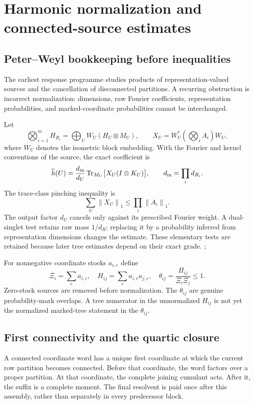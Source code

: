\documentclass[11pt,oneside,openany]{book}
\theoremstyle{definition}
\theoremstyle{remark}
\newcommand{\Tr}{\operatorname{Tr}}
\newcommand{\norm}[1]{\left\lVert#1\right\rVert}
\newcommand{\src}[2]{\cite[#2]{#1}}
\begin{document}
\chapter{Harmonic normalization and connected-source estimates}
\label{ch:trees}
\section{Peter--Weyl bookkeeping before inequalities}
The earliest response programme studies products of representation-valued sources and the cancellation of disconnected partitions. A recurring obstruction is incorrect normalization: dimensions, raw Fourier coefficients, representation probabilities, and marked-coordinate probabilities cannot be interchanged.

Let
\[
\bigotimes_{i=1}^m H_{R_i}
=\bigoplus_U W_U(H_U\otimes M_U),\qquad
X_U=W_U^*\left(\bigotimes_i A_i\right)W_U,
\]
where $W_U$ denotes the isometric block embedding. With the Fourier and kernel conventions of the source, the exact coefficient is
\begin{equation}\label{eq:PW}
\widehat h(U)=\frac{d_{\rm in}}{d_U}
\Tr_{M_U}\bigl[X_U(I\otimes K_U)\bigr],\qquad
 d_{\rm in}=\prod_i d_{R_i}.
\end{equation}
The trace-class pinching inequality is
\begin{equation}\label{eq:pinching}
\sum_U\norm{X_U}_1\le\prod_i\norm{A_i}_1.
\end{equation}
The output factor $d_U$ cancels only against its prescribed Fourier weight. A dual-singlet test retains raw mass $1/d_R$; replacing it by a probability inferred from representation dimensions changes the estimate. These elementary tests are retained because later tree estimates depend on their exact grade. \src{F1}{harmonic source programme}; \src{F2}{opening normalization audit}

For nonnegative coordinate stocks $a_{i,e}$ define
\begin{equation}\label{eq:marks}
\Xi_i=\sum_e a_{i,e},\quad
H_{ij}=\sum_e a_{i,e}a_{j,e},\quad
\theta_{ij}=\frac{H_{ij}}{\Xi_i\Xi_j}\le1.
\end{equation}
Zero-stock sources are removed before normalization. The $\theta_{ij}$ are genuine probability-mark overlaps. A tree numerator in the unnormalized $H_{ij}$ is not yet the normalized marked-tree statement in the $\theta_{ij}$.

\section{First connectivity and the quartic closure}
A connected coordinate word has a unique first coordinate at which the current row partition becomes connected. Before that coordinate, the word factors over a proper partition. At that coordinate, the complete joining cumulant acts. After it, the suffix is a complete moment. The final resolvent is paid once after this assembly, rather than separately in every predecessor block.
\end{document}
